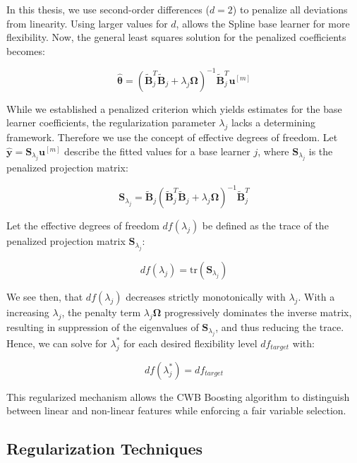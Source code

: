 \documentclass[fontsize=12 pt]{scrartcl}
\begin{document}
In this thesis, we use second-order differences ($d=2$) to penalize all deviations from linearity. Using larger values for $d$, allows the Spline base learner for more flexibility. Now, the general least squares solution for the penalized coefficients becomes:

\begin{equation}
    \hat{\boldsymbol{\theta}} = (\tilde{\mathbf{B}}_j^T \tilde{\mathbf{B}}_j + \lambda_j \boldsymbol{\Omega})^{-1} \tilde{\mathbf{B}}_j^T \mathbf{u}^{[m]}
\end{equation}

While we established a penalized criterion which yields estimates for the base learner coefficients, the regularization parameter $\lambda_j$ lacks a determining framework. Therefore we use the concept of effective degrees of freedom. Let $\hat{\mathbf{y}} = \mathbf{S}_{\lambda_j} \mathbf{u}^{[m]}$ describe the fitted values for a base learner $j$, where $\mathbf{S}_{\lambda_j}$ is the penalized projection matrix: 

\begin{equation}
    \mathbf{S}_{\lambda_j} = \tilde{\mathbf{B}}_j (\tilde{\mathbf{B}}_j^T \tilde{\mathbf{B}}_j + \lambda_j \boldsymbol{\Omega})^{-1} \tilde{\mathbf{B}}_j^T
\end{equation}

Let the effective degrees of freedom $df(\lambda_j)$ be defined as the trace of the penalized projection matrix $\mathbf{S}_{\lambda_j}$:

\begin{equation}
    df(\lambda_j) = \text{tr}(\mathbf{S}_{\lambda_j})
\end{equation}

We see then, that $df(\lambda_j)$ decreases strictly monotonically with $\lambda_j$. With a increasing $\lambda_j$, the penalty term $\lambda_j \boldsymbol{\Omega}$ progressively dominates the inverse matrix, resulting in suppression of the eigenvalues of $\mathbf{S}_{\lambda_j}$, and thus reducing the trace. Hence, we can solve for $\lambda_j^*$ for each desired flexibility level $df_{target}$ with:

\begin{equation}
    df(\lambda_j^*) = df_{target}
\end{equation}

This regularized mechanism allows the CWB Boosting algorithm to distinguish between linear and non-linear features while enforcing a fair variable selection.

\subsection{Regularization Techniques}
\end{document}

